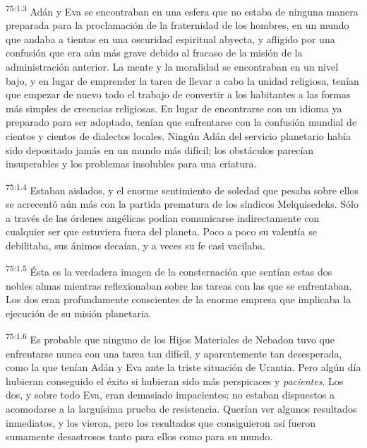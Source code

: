 \par
\textsuperscript{75:1.3} Adán y Eva se encontraban en una esfera que no estaba de ninguna manera preparada para la proclamación de la fraternidad de los hombres, en un mundo que andaba a tientas en una oscuridad espiritual abyecta, y afligido por una confusión que era aún más grave debido al fracaso de la misión de la administración anterior. La mente y la moralidad se encontraban en un nivel bajo, y en lugar de emprender la tarea de llevar a cabo la unidad religiosa, tenían que empezar de nuevo todo el trabajo de convertir a los habitantes a las formas más simples de creencias religiosas. En lugar de encontrarse con un idioma ya preparado para ser adoptado, tenían que enfrentarse con la confusión mundial de cientos y cientos de dialectos locales. Ningún Adán del servicio planetario había sido depositado jamás en un mundo más difícil; los obstáculos parecían insuperables y los problemas insolubles para una criatura.

\par
\textsuperscript{75:1.4} Estaban aislados, y el enorme sentimiento de soledad que pesaba sobre ellos se acrecentó aún más con la partida prematura de los síndicos Melquisedeks. Sólo a través de las órdenes angélicas podían comunicarse indirectamente con cualquier ser que estuviera fuera del planeta. Poco a poco su valentía se debilitaba, sus ánimos decaían, y a veces su fe casi vacilaba.

\par
\textsuperscript{75:1.5} Ésta es la verdadera imagen de la consternación que sentían estas dos nobles almas mientras reflexionaban sobre las tareas con las que se enfrentaban. Los dos eran profundamente conscientes de la enorme empresa que implicaba la ejecución de su misión planetaria.

\par
\textsuperscript{75:1.6} Es probable que ninguno de los Hijos Materiales de Nebadon tuvo que enfrentarse nunca con una tarea tan difícil, y aparentemente tan desesperada, como la que tenían Adán y Eva ante la triste situación de Urantia. Pero algún día hubieran conseguido el éxito si hubieran sido más perspicaces y \textit{pacientes}. Los dos, y sobre todo Eva, eran demasiado impacientes; no estaban dispuestos a acomodarse a la larguísima prueba de resistencia. Querían ver algunos resultados inmediatos, y los vieron, pero los resultados que consiguieron así fueron sumamente desastrosos tanto para ellos como para su mundo.

